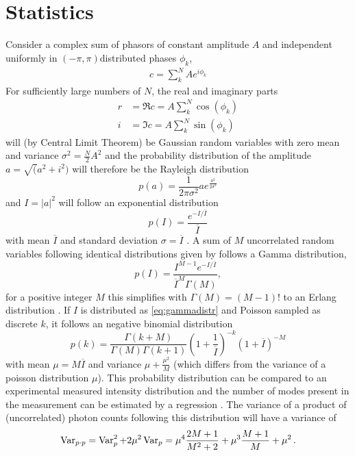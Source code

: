 \section{Statistics}
Consider a complex sum of phasors of constant amplitude $A$ and independent uniformly in $(-\pi,\pi)$distributed phases $\phi_k$,
\begin{align}
c=\sum^N_k A e^{i\phi_k}
\end{align}
For sufficiently large numbers of $N$, the real and imaginary parts
\begin{align*}
r&=\Re c =  A \sum^N_k \cos(\phi_k)\\
i&= \Im c =A \sum^N_k \sin(\phi_k)
\end{align*}
will (by Central Limit Theorem) be Gaussian random variables with zero mean and variance $\sigma^2=\frac{N}{2}A^2$ and the probability distribution of the amplitude $a=\sqrt(a^2+i^2)$ will  therefore be the Rayleigh distribution
\begin{equation}
p(a)=\frac{1}{2\pi\sigma^2} a e^{\frac{a^2}{2\sigma^2}}
\end{equation}
and  $I=\left|a\right|^2$ will  follow an exponential distribution
\begin{equation}
\label{eq:expdistr}
p(I)=\frac{ e^{-I/\overline{I}}}{\overline{I}}
\end{equation} 
with mean $\overline{I}$ and standard deviation $\sigma=\overline{I}$  \cite{goodman2000,goodman1976}.
A sum of $M$ uncorrelated random variables following identical distributions given by  follows a Gamma distribution,
\begin{equation}
\label{eq:gammadistr}
p(I)=\frac{I^{M-1} e^{-I/\overline{I}}} {\overline{I}^M \Gamma(M)},
\end{equation}
for a positive integer $M$ this simplifies with $\Gamma(M)=(M-1)!$ to an Erlang distribution  \cite{forbes2010,trost2020}.
If $I$ is  distributed as \ref{eq:gammadistr} and Poisson sampled as discrete $k$, it follows  an negative binomial distribution
\cite{trost2020,mandel1959,holmes2019}
\begin{equation}
p(k)=
\frac{\Gamma(k+M)}{\Gamma(M)\Gamma(k+1) }
\left( 1+\frac{1}{\overline{I}}
\right)^{-k}
\left( 1+\overline{I}
\right)^{-M}
\end{equation}
with mean $\mu=M\overline{I}$ and variance $\mu+\frac{\mu^2}{M}$ (which differs from the variance of a poisson distribution $\mu$).
This probability distribution can be compared to an experimental measured intensity distribution and the number of modes present in the measurement can be estimated by a regression \cite{lehmkuhler2014,yun2019}.
The variance of a product of (uncorrelated) photon counts  following this distribution will have a variance of
\begin{equation}
\operatorname{Var}_{p\cdot p}= \operatorname{Var}_p^2 +2 \mu^2\operatorname{Var}_p	= \mu^4 \frac{2 M + 1}{M^2 + 2}+ \mu^3 \frac{M+1}{M} + \mu^2 \,.
\end{equation}

